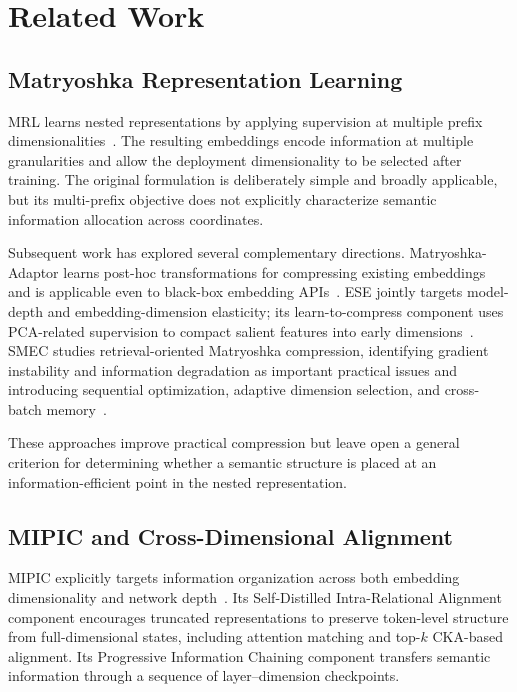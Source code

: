 \documentclass[11pt]{article}
\begin{document}
\section{Related Work}

\subsection{Matryoshka Representation Learning}

MRL learns nested representations by applying supervision at multiple prefix dimensionalities~\cite{kusupati2022matryoshka}.
The resulting embeddings encode information at multiple granularities and allow the deployment dimensionality to be selected after training.
The original formulation is deliberately simple and broadly applicable, but its multi-prefix objective does not explicitly characterize semantic information allocation across coordinates.

Subsequent work has explored several complementary directions.
Matryoshka-Adaptor learns post-hoc transformations for compressing existing embeddings and is applicable even to black-box embedding APIs~\cite{yoon2024matryoshka}.
ESE jointly targets model-depth and embedding-dimension elasticity; its learn-to-compress component uses PCA-related supervision to compact salient features into early dimensions~\cite{li2025ese}.
SMEC studies retrieval-oriented Matryoshka compression, identifying gradient instability and information degradation as important practical issues and introducing sequential optimization, adaptive dimension selection, and cross-batch memory~\cite{zhang2025smec}.

These approaches improve practical compression but leave open a general criterion for determining whether a semantic structure is placed at an information-efficient point in the nested representation.

\subsection{MIPIC and Cross-Dimensional Alignment}

MIPIC explicitly targets information organization across both embedding dimensionality and network depth~\cite{huy2026mipic}.
Its Self-Distilled Intra-Relational Alignment component encourages truncated representations to preserve token-level structure from full-dimensional states, including attention matching and top-$k$ CKA-based alignment.
Its Progressive Information Chaining component transfers semantic information through a sequence of layer--dimension checkpoints.
\end{document}
